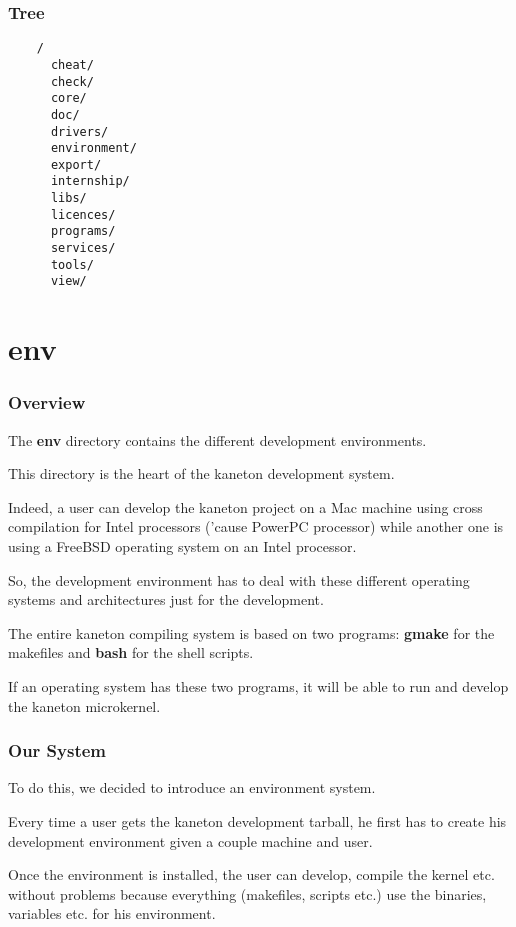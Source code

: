 
\begin{frame}[containsverbatim]
  \frametitle{Tree}

  \begin{center}

  \begin{verbatim}
    /
      cheat/
      check/
      core/
      doc/
      drivers/
      environment/
      export/
      internship/
      libs/
      licences/
      programs/
      services/
      tools/
      view/
  \end{verbatim}

  \end{center}
\end{frame}

%
%

\section{env}


\begin{frame}
  \frametitle{Overview}

  The \textbf{env} directory contains the different development environments.

  \nl

  This directory is the heart of the kaneton development system.

  \nl

  Indeed, a user can develop the kaneton project on a Mac machine using
  cross compilation for Intel processors ('cause PowerPC processor)
  while another one is using a FreeBSD operating system on an Intel processor.

  \nl

  So, the development environment has to deal with these different operating
  systems and architectures just for the development.

  \nl

  The entire kaneton compiling system is based on two programs:
  \textbf{gmake} for the makefiles and \textbf{bash} for the shell scripts.

  \nl

  If an operating system has these two programs, it will be able to run
  and develop the kaneton microkernel.
\end{frame}


\begin{frame}
  \frametitle{Our System}

  To do this, we decided to introduce an environment system.

  \nl

  Every time a user gets the kaneton development tarball, he first has to
  create his development environment given a couple machine and user.

  \nl

  Once the environment is installed, the user can develop, compile the kernel
  etc. without problems because everything (makefiles, scripts etc.) use
  the binaries, variables etc. for his environment.
\end{frame}

